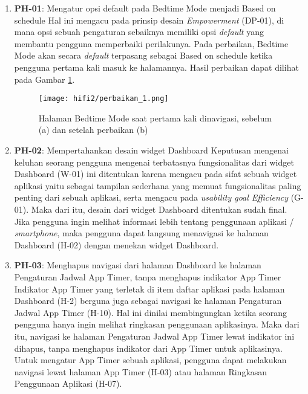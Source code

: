 \begin{enumerate}
  \item \textbf{PH-01}: Mengatur opsi default pada Bedtime Mode menjadi Based on schedule
  \subitem Hal ini mengacu pada prinsip desain \textit{Empowerment} (DP-01), di mana opsi sebuah pengaturan sebaiknya memiliki opsi \textit{default} yang membantu pengguna memperbaiki perilakunya. Pada perbaikan, Bedtime Mode akan secara \textit{default} terpasang sebagai Based on schedule ketika pengguna pertama kali masuk ke halamannya. Hasil perbaikan dapat dilihat pada Gambar \ref{img:perbaikan_1}.
  
  \begin{figure}[h]
    \centering
    \texttt{[image: hifi2/perbaikan\_1.png]}
    \caption{Halaman Bedtime Mode saat pertama kali dinavigasi, sebelum (a) dan setelah perbaikan (b)}
    \label{img:perbaikan_1}
  \end{figure}
  \FloatBarrier

  
  \item \textbf{PH-02}: Mempertahankan desain widget Dashboard
  \subitem Keputusan mengenai keluhan seorang pengguna mengenai terbatasnya fungsionalitas dari widget Dashboard (W-01) ini ditentukan karena mengacu pada sifat sebuah widget aplikasi yaitu sebagai tampilan sederhana yang memuat fungsionalitas paling penting dari sebuah aplikasi, serta mengacu pada \textit{usability goal Efficiency} (G-01). Maka dari itu, desain dari widget Dashboard ditentukan sudah final. Jika pengguna ingin melihat informasi lebih tentang penggunaan aplikasi / \textit{smartphone}, maka pengguna dapat langsung menavigasi ke halaman Dashboard (H-02) dengan menekan widget Dashboard.  

  \item \textbf{PH-03}: Menghapus navigasi dari halaman Dashboard ke halaman Pengaturan Jadwal App Timer, tanpa menghapus indikator App Timer
  \subitem Indikator App Timer yang terletak di item daftar aplikasi pada halaman Dashboard (H-2) berguna juga sebagai navigasi ke halaman Pengaturan Jadwal App Timer (H-10). Hal ini dinilai membingungkan ketika seorang pengguna hanya ingin melihat ringkasan penggunaan aplikasinya. Maka dari itu, navigasi ke halaman Pengaturan Jadwal App Timer lewat indikator ini dihapus, tanpa menghapus indikator dari App Timer untuk aplikasinya. Untuk mengatur App Timer sebuah aplikasi, pengguna dapat melakukan navigasi lewat halaman App Timer (H-03) atau halaman Ringkasan Penggunaan Aplikasi (H-07).


\end{enumerate}
